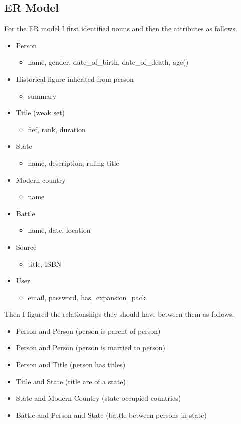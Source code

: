 \documentclass[11pt]{article}
\begin{document}
\subsection{ER Model}
\label{sec:org72b218d}
For the ER model I first identified nouns and then the attributes as follows.
\begin{itemize}
\item Person
\begin{itemize}
\item name, gender, date\_of\_birth, date\_of\_death, age()
\end{itemize}
\item Historical figure inherited from person
\begin{itemize}
\item summary
\end{itemize}
\item Title (weak set)
\begin{itemize}
\item fief, rank, duration
\end{itemize}
\item State
\begin{itemize}
\item name, description, ruling title
\end{itemize}
\item Modern country
\begin{itemize}
\item name
\end{itemize}
\item Battle
\begin{itemize}
\item name, date, location
\end{itemize}
\item Source
\begin{itemize}
\item title, ISBN
\end{itemize}
\item User
\begin{itemize}
\item email, password, has\_expansion\_pack
\end{itemize}
\end{itemize}

Then I figured the relationships they should have between them as follows.
\begin{itemize}
\item Person and Person (person is parent of person)
\item Person and Person (person is married to person)
\item Person and Title (person has titles)
\item Title and State (title are of a state)
\item State and Modern Country (state occupied countries)
\item Battle and Person and State (battle between persons in state)
\end{itemize}
\end{document}
